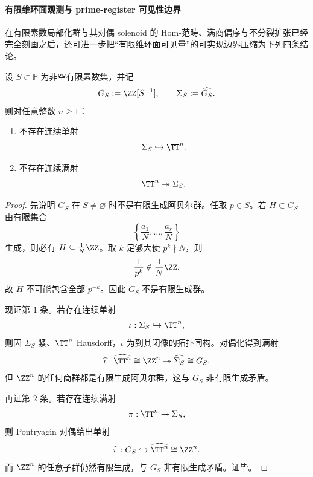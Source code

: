 \paragraph{有限维环面观测与 prime-register 可见性边界}
在有限素数局部化群与其对偶 solenoid 的 \(\mathrm{Hom}\)-范畴、满商偏序与不分裂扩张已经完全刻画之后，还可进一步把“有限维环面可见量”的可实现边界压缩为下列四条结论。

\begin{theorem}\label{thm:xi-cdim-localization-solenoid-not-subgroup-or-quotient-of-finite-torus}
设 \(S\subset\mathbb P\) 为非空有限素数集，并记
\[
G_S:=\ZZ[S^{-1}],
\qquad
\Sigma_S:=\widehat{G_S}.
\]
则对任意整数 \(n\ge 1\)：
\begin{enumerate}
  \item 不存在连续单射
  \[
  \Sigma_S\hookrightarrow \TT^n.
  \]
  \item 不存在连续满射
  \[
  \TT^n\twoheadrightarrow \Sigma_S.
  \]
\end{enumerate}
\end{theorem}
\begin{proof}
先说明 \(G_S\) 在 \(S\neq\varnothing\) 时不是有限生成阿贝尔群。任取 \(p\in S\)。若 \(H\subset G_S\) 由有限集合
\[
\left\{\frac{a_1}{N},\dots,\frac{a_r}{N}\right\}
\]
生成，则必有 \(H\subseteq \frac1N\ZZ\)。取 \(k\) 足够大使 \(p^k\nmid N\)，则
\[
\frac{1}{p^k}\notin \frac1N\ZZ,
\]
故 \(H\) 不可能包含全部 \(p^{-k}\)。因此 \(G_S\) 不是有限生成群。

现证第 \(1\) 条。若存在连续单射
\[
\iota:\Sigma_S\hookrightarrow \TT^n,
\]
则因 \(\Sigma_S\) 紧、\(\TT^n\) Hausdorff，\(\iota\) 为到其闭像的拓扑同构。对偶化得到满射
\[
\widehat\iota:\widehat{\TT^n}\cong \ZZ^n\twoheadrightarrow \widehat{\Sigma_S}\cong G_S.
\]
但 \(\ZZ^n\) 的任何商群都是有限生成阿贝尔群，这与 \(G_S\) 非有限生成矛盾。

再证第 \(2\) 条。若存在连续满射
\[
\pi:\TT^n\twoheadrightarrow \Sigma_S,
\]
则 Pontryagin 对偶给出单射
\[
\widehat\pi:G_S\hookrightarrow \widehat{\TT^n}\cong \ZZ^n.
\]
而 \(\ZZ^n\) 的任意子群仍然有限生成，与 \(G_S\) 非有限生成矛盾。证毕。
\end{proof}

